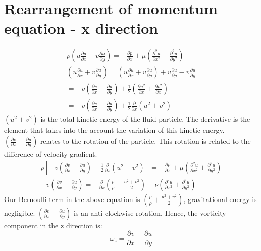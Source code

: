\section{Rearrangement of momentum equation - x direction}
\begin{gather}
  \rho \left( u \frac{\partial u}{\partial x} + v\frac{\partial u}{\partial y} \right) = -\frac{\partial p}{\partial x}  + \mu \left( \frac{\partial^2 u}{\partial x^2} + \frac{\partial^2 u}{\partial y^2} \right)\\
  \left(u \frac{\partial u}{\partial x} + v \frac{\partial u}{\partial y} \right) = \left(u \frac{\partial u}{\partial x} + v \frac{\partial u}{\partial y} \right) + v \frac{\partial u}{\partial y} - v \frac{\partial u}{\partial y}\\
  = - v \left(\frac{\partial v}{\partial x} - \frac{\partial u}{\partial y} \right) + \frac{1}{2} \left( \frac{\partial u^2}{\partial x} + \frac{\partial v^2}{\partial x} \right)\\
  = - v \left( \frac{\partial v}{\partial x} - \frac{\partial u}{\partial y} \right) + \frac{1}{2} \frac{\partial}{\partial x} (u^2 + v^2)
\end{gather}
$(u^2 + v^2)$ is the total kinetic energy of the fluid particle. The derivative is the element that takes into the account the variation of this kinetic energy. $\left( \frac{\partial v}{\partial x} - \frac{\partial u}{\partial y} \right)$ relates to the rotation of the particle. This rotation is related to the difference of velocity gradient.
\begin{gather}
  \rho \left[ -v \left( \frac{\partial v}{\partial x} - \frac{\partial u}{\partial y} \right) + \frac{1}{2} \frac{\partial}{\partial x} (u^2 + v^2) \right] = - \frac{\partial p}{\partial x} + \mu \left( \frac{\partial^2 u}{\partial x^2} + \frac{\partial^2 u}{\partial y^2} \right)\\
  - v \left( \frac{\partial v}{\partial x} - \frac{\partial u}{\partial y} \right) = - \frac{\partial}{\partial x} \left( \frac{p}{\rho} + \frac{u^2 + v^2}{2} \right) + \nu \left( \frac{\partial^2 u}{\partial x^2} + \frac{\partial^2 u}{\partial y^2} \right)
\end{gather}
Our Bernoulli term in the above equation is $\left( \frac{p}{\rho} + \frac{u^2 + v^2}{2} \right)$, gravitational energy is negligible. $\left( \frac{\partial v}{\partial x} - \frac{\partial u}{\partial y} \right)$ is an anti-clockwise rotation. Hence, the vorticity component in the z direction is:
\begin{equation}
  \omega_z = \frac{\partial v}{\partial x} - \frac{\partial u}{\partial y}
\end{equation}
